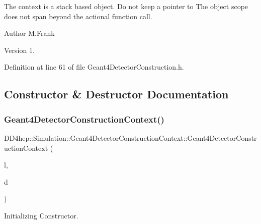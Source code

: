 The context is a stack based object. Do not keep a pointer to The object scope does not span beyond the actional function call.

\begin{DoxyAuthor}{Author}
M.\+Frank 
\end{DoxyAuthor}
\begin{DoxyVersion}{Version}
1. 
\end{DoxyVersion}


Definition at line 61 of file Geant4\+Detector\+Construction.\+h.



\subsection{Constructor \& Destructor Documentation}
\hypertarget{class_d_d4hep_1_1_simulation_1_1_geant4_detector_construction_context_abb7bca1e231bedcaa5247d54dd18adda}{}\label{class_d_d4hep_1_1_simulation_1_1_geant4_detector_construction_context_abb7bca1e231bedcaa5247d54dd18adda} 
\subsubsection{\texorpdfstring{Geant4\+Detector\+Construction\+Context()}{Geant4DetectorConstructionContext()}}
{\footnotesize\ttfamily D\+D4hep\+::\+Simulation\+::\+Geant4\+Detector\+Construction\+Context\+::\+Geant4\+Detector\+Construction\+Context (\begin{DoxyParamCaption}\item[{\hyperlink{class_d_d4hep_1_1_geometry_1_1_l_c_d_d}{Geometry\+::\+L\+C\+DD} \&}]{l,  }\item[{\hyperlink{class_g4_v_user_detector_construction}{G4\+V\+User\+Detector\+Construction} $\ast$}]{d }\end{DoxyParamCaption})\hspace{0.3cm}{\ttfamily [inline]}}



Initializing Constructor. 



